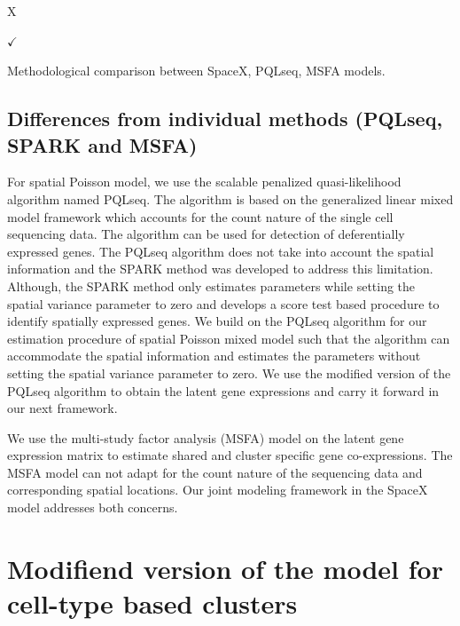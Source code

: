 \documentclass[
]{book}
\begin{document}
X

\(\checkmark\)

\label{tab:differentmodeloverviewqsn4} Methodological comparison between SpaceX, PQLseq, MSFA models.

\hypertarget{differences-from-individual-methods-pqlseq-spark-and-msfa}{%
\subsection{Differences from individual methods (PQLseq, SPARK and MSFA)}\label{differences-from-individual-methods-pqlseq-spark-and-msfa}}

For spatial Poisson model, we use the scalable penalized quasi-likelihood algorithm named PQLseq. The algorithm is based on the generalized linear mixed model framework which accounts for the count nature of the single cell sequencing data. The algorithm can be used for detection of deferentially expressed genes. The PQLseq algorithm does not take into account the spatial information and the SPARK \citep{sun2020statistical} method was developed to address this limitation. Although, the SPARK method only estimates parameters while setting the spatial variance parameter to zero and develops a score test based procedure to identify spatially expressed genes. We build on the PQLseq algorithm for our estimation procedure of spatial Poisson mixed model such that the algorithm can accommodate the spatial information and estimates the parameters without setting the spatial variance parameter to zero. We use the modified version of the PQLseq algorithm to obtain the latent gene expressions and carry it forward in our next framework.

We use the multi-study factor analysis (MSFA) model \citep{de2018bayesian} on the latent gene expression matrix to estimate shared and cluster specific gene co-expressions. The MSFA model can not adapt for the count nature of the sequencing data and corresponding spatial locations. Our joint modeling framework in the SpaceX model addresses both concerns.

\hypertarget{modifiend-version-of-the-model-for-cell-type-based-clusters}{%
\section{Modifiend version of the model for cell-type based clusters}\label{modifiend-version-of-the-model-for-cell-type-based-clusters}}
\end{document}
